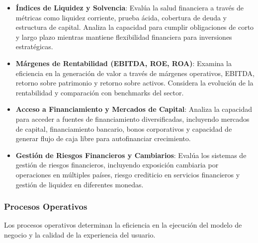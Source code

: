 \begin{itemize}
\item \textbf{Índices de Liquidez y Solvencia}: Evalúa la salud financiera a través de métricas como liquidez corriente, prueba ácida, cobertura de deuda y estructura de capital. Analiza la capacidad para cumplir obligaciones de corto y largo plazo mientras mantiene flexibilidad financiera para inversiones estratégicas.

\item \textbf{Márgenes de Rentabilidad (EBITDA, ROE, ROA)}: Examina la eficiencia en la generación de valor a través de márgenes operativos, EBITDA, retorno sobre patrimonio y retorno sobre activos. Considera la evolución de la rentabilidad y comparación con benchmarks del sector.

\item \textbf{Acceso a Financiamiento y Mercados de Capital}: Analiza la capacidad para acceder a fuentes de financiamiento diversificadas, incluyendo mercados de capital, financiamiento bancario, bonos corporativos y capacidad de generar flujo de caja libre para autofinanciar crecimiento.

\item \textbf{Gestión de Riesgos Financieros y Cambiarios}: Evalúa los sistemas de gestión de riesgos financieros, incluyendo exposición cambiaria por operaciones en múltiples países, riesgo crediticio en servicios financieros y gestión de liquidez en diferentes monedas.
\end{itemize}

\subsubsection{Procesos Operativos}

Los procesos operativos determinan la eficiencia en la ejecución del modelo de negocio y la calidad de la experiencia del usuario.

